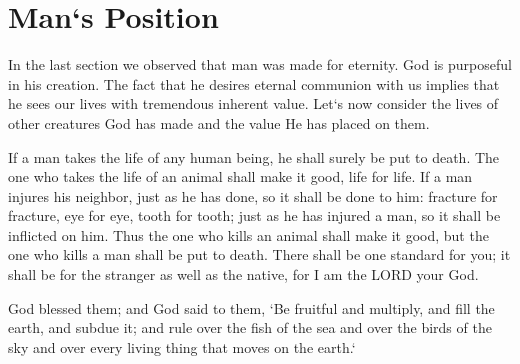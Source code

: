 \vspace{2\baselineskip}

\newpage
\section{Man`s Position}
\begin{fullwidth}
In the last section we observed that man was made for eternity. God is purposeful in his creation.
The fact that he desires eternal communion with us implies that he sees our lives with tremendous inherent value. Let`s now consider the lives 
of other creatures God has made and the value He has placed on them.
\end{fullwidth}

\vspace{2\baselineskip}

\begin{scripture}[Leviticus 24:17-22]
     If a man takes the life of any human being, he shall surely be put to death.
        The one who takes the life of an animal shall make it good, life for life.
        If a man injures his neighbor, just as he has done, so it shall be done to him:
        fracture for fracture, eye for eye, tooth for tooth; just as he has injured a man, so it shall be inflicted on him.
        Thus the one who kills an animal shall make it good, but the one who kills a man shall be put to death.
        There shall be one standard for you; it shall be for the stranger as well as the native, for I am the LORD your God.
\end{scripture}

\vspace{3\baselineskip}

\begin{scripture}[Gen 1:28]
    God blessed them; and God said to them, `Be fruitful and multiply, and fill the earth, and subdue it; and rule over the fish of the sea and over the birds of the sky and over every living thing that moves on the earth.`
\end{scripture}

\vspace{8\baselineskip}

